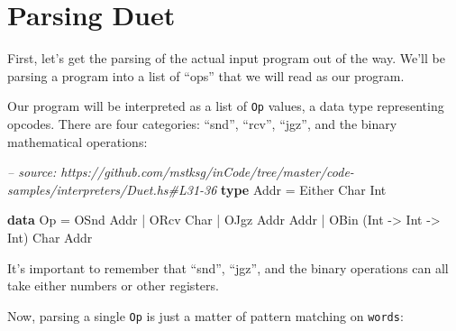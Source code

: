 \documentclass[]{article}
\newenvironment{Shaded}{}{}
\newcommand{\KeywordTok}[1]{\textcolor[rgb]{0.00,0.44,0.13}{\textbf{#1}}}
\newcommand{\DataTypeTok}[1]{\textcolor[rgb]{0.56,0.13,0.00}{#1}}
\newcommand{\CommentTok}[1]{\textcolor[rgb]{0.38,0.63,0.69}{\textit{#1}}}
\newcommand{\OtherTok}[1]{\textcolor[rgb]{0.00,0.44,0.13}{#1}}
\newcommand{\FunctionTok}[1]{\textcolor[rgb]{0.02,0.16,0.49}{#1}}
\newcommand{\NormalTok}[1]{#1}
\begin{document}
\section{Parsing Duet}\label{parsing-duet}

First, let's get the parsing of the actual input program out of the way. We'll
be parsing a program into a list of ``ops'' that we will read as our program.

Our program will be interpreted as a list of \texttt{Op} values, a data type
representing opcodes. There are four categories: ``snd'', ``rcv'', ``jgz'', and
the binary mathematical operations:

\begin{Shaded}
\begin{Highlighting}[]
\CommentTok{-- source: https://github.com/mstksg/inCode/tree/master/code-samples/interpreters/Duet.hs#L31-36}
\KeywordTok{type} \DataTypeTok{Addr} \FunctionTok{=} \DataTypeTok{Either} \DataTypeTok{Char} \DataTypeTok{Int}

\KeywordTok{data} \DataTypeTok{Op} \FunctionTok{=} \DataTypeTok{OSnd} \DataTypeTok{Addr}
        \FunctionTok{|} \DataTypeTok{ORcv} \DataTypeTok{Char}
        \FunctionTok{|} \DataTypeTok{OJgz} \DataTypeTok{Addr} \DataTypeTok{Addr}
        \FunctionTok{|} \DataTypeTok{OBin}\NormalTok{ (}\DataTypeTok{Int} \OtherTok{->} \DataTypeTok{Int} \OtherTok{->} \DataTypeTok{Int}\NormalTok{) }\DataTypeTok{Char} \DataTypeTok{Addr}
\end{Highlighting}
\end{Shaded}

It's important to remember that ``snd'', ``jgz'', and the binary operations can
all take either numbers or other registers.

Now, parsing a single \texttt{Op} is just a matter of pattern matching on
\texttt{words}:
\end{document}

